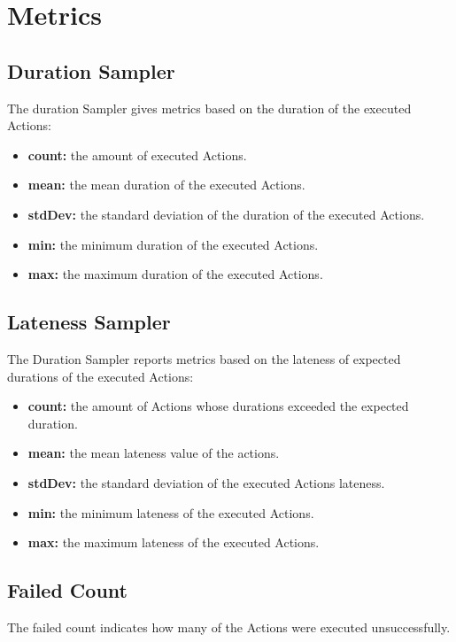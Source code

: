\section{Metrics}\label{sec:metrics}
\subsection{Duration Sampler}
The duration Sampler gives metrics based on the duration of the executed Actions:
\begin{itemize}
	\item \textbf{count:} the amount of executed Actions.
	\item \textbf{mean:} the mean duration of the executed Actions.
	\item \textbf{stdDev:} the standard deviation of the duration of the executed Actions.
	\item \textbf{min:} the minimum duration of the executed Actions.
	\item \textbf{max:} the maximum duration of the executed Actions.
\end{itemize}
\subsection{Lateness Sampler}
The Duration Sampler reports metrics based on the lateness of expected durations of the executed Actions:
\begin{itemize}
	\item \textbf{count:} the amount of Actions whose durations exceeded the expected duration.
	\item \textbf{mean:} the mean lateness value of the actions.
	\item \textbf{stdDev:} the standard deviation of the executed Actions lateness.
	\item \textbf{min:} the minimum lateness of the executed Actions.
	\item \textbf{max:} the maximum lateness of the executed Actions.
\end{itemize}

\subsection{Failed Count}
The failed count indicates how many of the Actions were executed unsuccessfully.



